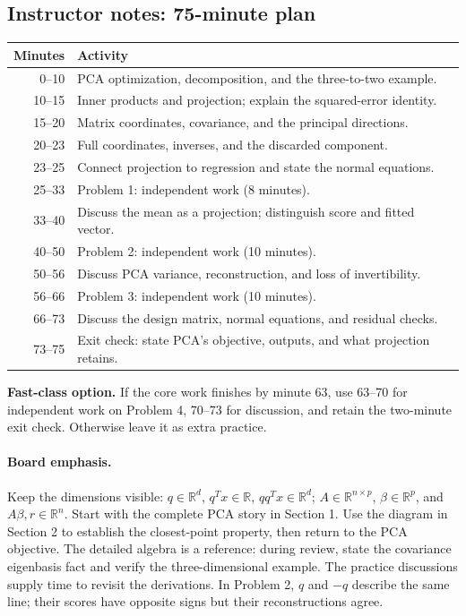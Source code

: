 \documentclass[11pt]{article}
\newif\ifsolutions
\newcommand{\R}{\mathbb R}
\begin{document}
\ifsolutions
\newpage
\subsection*{Instructor notes: 75-minute plan}
\begin{center}
\begin{tabular}{@{}r p{}@{}}
\toprule Minutes & Activity\\\midrule
0--10 & PCA optimization, decomposition, and the three-to-two example.\\
10--15 & Inner products and projection; explain the squared-error identity.\\
15--20 & Matrix coordinates, covariance, and the principal directions.\\
20--23 & Full coordinates, inverses, and the discarded component.\\
23--25 & Connect projection to regression and state the normal equations.\\
25--33 & Problem 1: independent work (8 minutes).\\
33--40 & Discuss the mean as a projection; distinguish score and fitted vector.\\
40--50 & Problem 2: independent work (10 minutes).\\
50--56 & Discuss PCA variance, reconstruction, and loss of invertibility.\\
56--66 & Problem 3: independent work (10 minutes).\\
66--73 & Discuss the design matrix, normal equations, and residual checks.\\
73--75 & Exit check: state PCA's objective, outputs, and what projection retains.\\
\bottomrule
\end{tabular}
\end{center}
\noindent\textbf{Fast-class option.} If the core work finishes by minute 63,
use 63--70 for independent work on Problem 4, 70--73 for discussion,
and retain the two-minute exit check. Otherwise leave it as extra practice.

\paragraph{Board emphasis.}
Keep the dimensions visible:
$q\in\R^d$, $q^Tx\in\R$, $qq^Tx\in\R^d$;
$A\in\R^{n\times p}$, $\beta\in\R^p$, and $A\beta,r\in\R^n$.
Start with the complete PCA story in Section 1. Use the diagram in
Section 2 to establish the closest-point property, then return to the
PCA objective. The detailed algebra is a reference: during review, state
the covariance eigenbasis fact and verify the three-dimensional example.
The practice discussions supply time to revisit the derivations.
In Problem 2, $q$ and $-q$ describe the same line;
their scores have opposite signs but their reconstructions agree.
\end{document}
